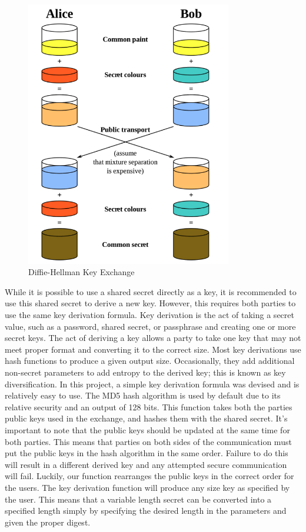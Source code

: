  \begin{figure}[t]
	\centering
	\includegraphics[width=9cm,height=0.7\textheight,keepaspectratio]{./figures/figure_3}
	\center\caption[font=footnote]{Diffie-Hellman Key Exchange}
\end{figure}

While it is possible to use a shared secret directly as a key, it is recommended to use this shared secret to derive a new key. However, this requires both parties to use the same key derivation formula. Key derivation is the act of taking a secret value, such as a password, shared secret, or passphrase and creating one or more secret keys. The act of deriving a key allows a party to take one key that may not meet proper format and converting it to the correct size. Most key derivations use hash functions to produce a given output size. Occasionally, they add additional non-secret parameters to add entropy to the derived key; this is known as key diversification. In this project,  a simple key derivation formula was devised and is relatively easy to use. The MD5 hash algorithm is used by default due to its relative security and an output of 128 bits. This function takes both the parties public keys used in the exchange, and hashes them with the shared secret. It's important to note that the public keys should be updated at the same time for both parties. This means that parties on both sides of the communication must put the public keys in the hash algorithm in the same order. Failure to do this will result in a different derived key and any attempted secure communication will fail. Luckily, our function rearranges the public keys in the correct order for the users. The key derivation function will produce any size key as specified by the user. This means that a variable length secret can be converted into a specified length simply by specifying the desired length in the parameters and given the proper digest. 

